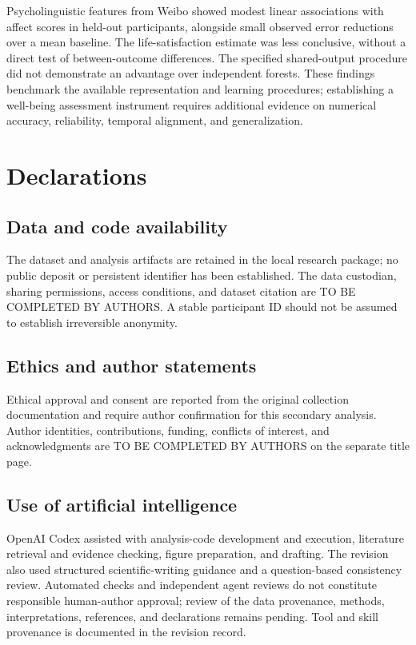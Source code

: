 \documentclass[11pt,letterpaper]{article}
\begin{document}
Psycholinguistic features from Weibo showed modest linear associations with affect scores in held-out participants, alongside small observed error reductions over a mean baseline. The life-satisfaction estimate was less conclusive, without a direct test of between-outcome differences. The specified shared-output procedure did not demonstrate an advantage over independent forests. These findings benchmark the available representation and learning procedures; establishing a well-being assessment instrument requires additional evidence on numerical accuracy, reliability, temporal alignment, and generalization.

\section{Declarations}\label{declarations}

\subsection{Data and code availability}\label{data-and-code-availability}

The dataset and analysis artifacts are retained in the local research package; no public deposit or persistent identifier has been established. The data custodian, sharing permissions, access conditions, and dataset citation are TO BE COMPLETED BY AUTHORS. A stable participant ID should not be assumed to establish irreversible anonymity.

\subsection{Ethics and author statements}\label{ethics-and-author-statements}

Ethical approval and consent are reported from the original collection documentation and require author confirmation for this secondary analysis. Author identities, contributions, funding, conflicts of interest, and acknowledgments are TO BE COMPLETED BY AUTHORS on the separate title page.

\subsection{Use of artificial intelligence}\label{use-of-artificial-intelligence}

OpenAI Codex assisted with analysis-code development and execution, literature retrieval and evidence checking, figure preparation, and drafting. The revision also used structured scientific-writing guidance and a question-based consistency review. Automated checks and independent agent reviews do not constitute responsible human-author approval; review of the data provenance, methods, interpretations, references, and declarations remains pending. Tool and skill provenance is documented in the revision record.
\end{document}
